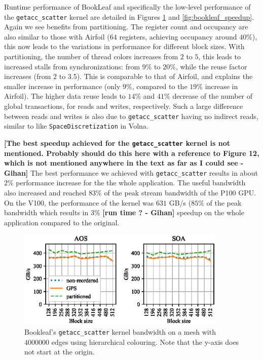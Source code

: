 Runtime performance of BookLeaf and specifically the low-level performance of 
the \texttt{getacc\_scatter} kernel are detailed in Figures
\ref{fig:bookleaf_bw-vs-bs_hier} and \ref{fig:bookleaf_speedup}. Again we see  
benefits from partitioning. The register count and occupancy are also similar to 
those with Airfoil ($64$ registers, achieving occupancy around $40\%$), this 
now leads to the variations in performance for different block sizes. With 
partitioning, the number of thread colors increases from $2$ to $5$, this
leads to increased stalls from synchronizations: from $9\%$ to $20\%$, while
the reuse factor increases (from $2$ to $3.5$). This is comparable to 
that of Airfoil, and explains the smaller increase in performance (only $9\%$, 
compared to the $19\%$ increase in Airfoil). The higher data reuse leads to 
$14\%$ and $41\%$ decrease of the number of global transactions, for reads and 
writes, respectively. Such a large difference between reads and writes is also 
due to \texttt{getacc\_scatter} having no indirect reads, similar to 
like \texttt{SpaceDiscretization} in Volna. 

\textbf{[The best speedup achieved for the \texttt{getacc\_scatter} kernel is 
not mentioned. Probably should do this here with a reference to Figure 12, 
which is not mentioned anywhere in the text as far as I could see - Gihan]} The 
best performance we achieved with \texttt{getacc\_scatter} results in about
$2\%$ performance increase for the the whole application. The useful bandwidth
also increased and reached $83\%$ of the peak stream bandwidth of the P100 GPU. 
On the V100, the performance of the kernel was $631$ GB/s ($85\%$ of the peak
bandwidth which results in $3\%$ \textbf{[run time ? - Gihan]} speedup on the 
whole application compared to the original.

\begin{figure}[Htbp]
\centering
\includegraphics[width=10cm]{fig/bookleaf_bw-vs-bs_hier.eps}
\caption{Bookleaf's \texttt{getacc\_scatter} kernel bandwidth on a mesh with 
$4000000$ edges using hierarchical colouring. Note that the y-axis does not 
start at the origin.} \label{fig:bookleaf_bw-vs-bs_hier}
\end{figure}

